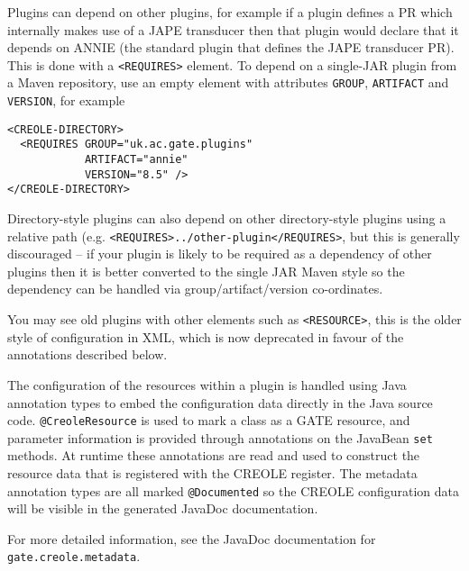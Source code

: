 Plugins can depend on other plugins, for example if a plugin defines a PR which
internally makes use of a JAPE transducer then that plugin would declare that
it depends on ANNIE (the standard plugin that defines the JAPE transducer PR).
This is done with a \verb|<REQUIRES>| element.  To depend on a single-JAR
plugin from a Maven repository, use an empty element with attributes
\verb|GROUP|, \verb|ARTIFACT| and \verb|VERSION|, for example
\begin{small}\begin{verbatim}
<CREOLE-DIRECTORY>
  <REQUIRES GROUP="uk.ac.gate.plugins"
            ARTIFACT="annie"
            VERSION="8.5" />
</CREOLE-DIRECTORY>
\end{verbatim}\end{small}

Directory-style plugins can also depend on other directory-style plugins using
a relative path (e.g. \verb|<REQUIRES>../other-plugin</REQUIRES>|, but this is
generally discouraged -- if your plugin is likely to be required as a
dependency of other plugins then it is better converted to the single JAR Maven
style so the dependency can be handled via group/artifact/version co-ordinates.

You may see old plugins with other elements such as \verb|<RESOURCE>|, this is
the older style of configuration in XML, which is now deprecated in favour of
the annotations described below.


The configuration of the resources within a plugin is handled using Java
annotation types to embed the configuration data directly in the Java source
code.  \verb|@CreoleResource| is used to mark a class as a GATE resource, and
parameter information is provided through annotations on the JavaBean {\tt set}
methods.  At runtime these annotations are read and used to construct the
resource data that is registered with the CREOLE register.  The metadata
annotation types are all marked \verb|@Documented| so the CREOLE configuration
data will be visible in the generated JavaDoc documentation.

For more detailed information, see the
JavaDoc documentation for {\tt gate.creole.metadata}.


